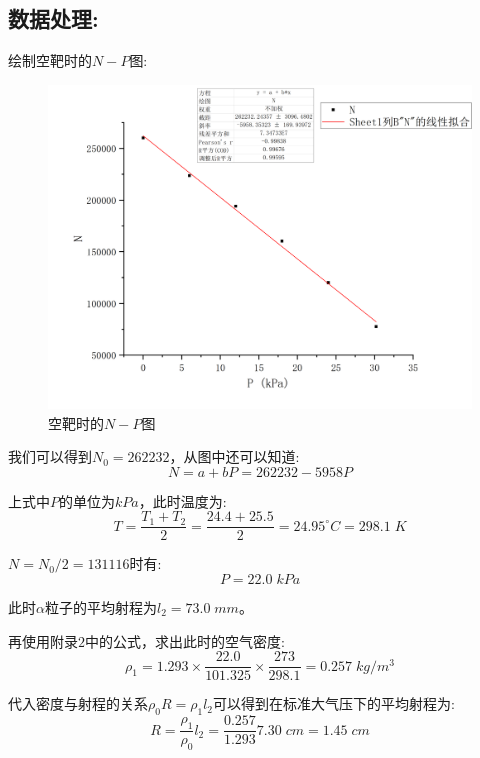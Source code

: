 \documentclass[utf8]{ctexart}
\begin{document}
\subsection*{数据处理:}
绘制空靶时的$N-P$图:
\begin{figure}[htbp]
	\centering
	\includegraphics[scale=0.4]{Graph1.png}
	\caption{空靶时的$N-P$图}
\end{figure}

我们可以得到$N_0 = 262232$，从图中还可以知道:
\begin{equation}
	N = a+bP = 262232 - 5958P
\end{equation}

上式中$P$的单位为$kPa$，此时温度为:
$$
T = \frac{T_1+T_2}{2} = \frac{24.4+25.5}{2} = 24.95^{\circ}C = 298.1 \; K
$$

$N=N_0/2 = 131116$时有:
$$
P = 22.0\;kPa
$$

此时$\alpha$粒子的平均射程为$l_2 = 73.0 \; mm$。

再使用附录$2$中的公式，求出此时的空气密度:
\begin{equation}
	\rho_1 = 1.293 \times \frac{22.0}{101.325} \times \frac{273}{298.1} = 0.257 \; kg/m^3
\end{equation}

代入密度与射程的关系$\rho_0 R = \rho_1 l_2 $可以得到在标准大气压下的平均射程为:
\begin{equation}
	R = \frac{\rho_1}{\rho_0}l_2 = \frac{0.257}{1.293}7.30 \; cm = 1.45 \; cm
\end{equation}
\end{document}
